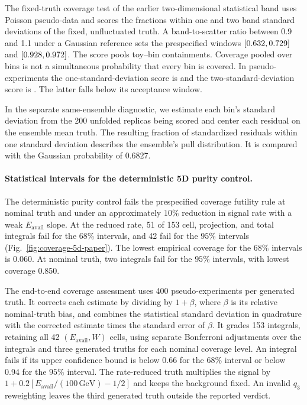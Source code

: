 The fixed-truth coverage test of the earlier two-dimensional statistical band uses Poisson pseudo-data and scores the fractions within one and two band standard deviations of the fixed, unfluctuated truth. A band-to-scatter ratio between 0.9 and 1.1 under a Gaussian reference sets the prespecified windows $[0.632,0.729]$ and $[0.928,0.972]$. The score pools toy--bin containments. Coverage pooled over bins is not a simultaneous probability that every bin is covered. In \covTwoDNtoy{} pseudo-experiments the one-standard-deviation score is \covTwoDCOne{} and the two-standard-deviation score is \covTwoDCTwo{}. The latter falls below its acceptance window.

\label{sec:pull-diagnostic} In the separate same-ensemble diagnostic, we estimate each bin's standard deviation from the 200 unfolded replicas being scored and center each residual on the ensemble mean truth. The resulting fraction of standardized residuals within one standard deviation describes the ensemble's pull distribution. It is compared with the Gaussian probability of 0.6827.

\paragraph{Statistical intervals for the deterministic 5D purity control.}
\label{sec:coverage-5d}
The deterministic purity control fails the prespecified coverage futility rule at nominal truth and under an approximately $10\%$ reduction in signal rate with a weak $E_{\mathrm{avail}}$ slope. At the reduced rate, 51 of 153 cell, projection, and total integrals fail for the $68\%$ intervals, and 42 fail for the $95\%$ intervals (Fig.~\ref{fig:coverage-5d-paper}). The lowest empirical coverage for the $68\%$ intervals is 0.060. At nominal truth, two integrals fail for the $95\%$ intervals, with lowest coverage 0.850.

The end-to-end coverage assessment uses 400 pseudo-experiments per generated truth. It corrects each estimate by dividing by $1+\beta$, where $\beta$ is its relative nominal-truth bias, and combines the statistical standard deviation in quadrature with the corrected estimate times the standard error of $\beta$. It grades 153 integrals, retaining all 42 $(E_{\mathrm{avail}},W)$ cells, using separate Bonferroni adjustments over the integrals and three generated truths for each nominal coverage level. An integral fails if its upper confidence bound is below 0.66 for the $68\%$ interval or below 0.94 for the $95\%$ interval. The rate-reduced truth multiplies the signal by $1+0.2[E_{\mathrm{avail}}/(100\,\mathrm{GeV})-1/2]$ and keeps the background fixed. An invalid $q_3$ reweighting leaves the third generated truth outside the reported verdict.

